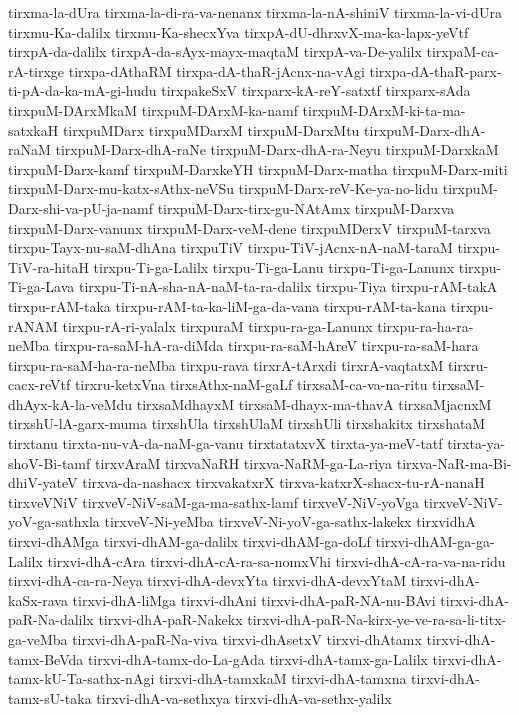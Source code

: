 {tirxma-la-dUra
tirxma-la-di-ra-va-nenanx
tirxma-la-nA-shiniV
tirxma-la-vi-dUra
tirxmu-Ka-dalilx
tirxmu-Ka-shecxYva
tirxpA-dU-dhrxvX-ma-ka-lapx-yeVtf
tirxpA-da-dalilx
tirxpA-da-sAyx-mayx-maqtaM
tirxpA-va-De-yalilx
tirxpaM-ca-rA-tirxge
tirxpa-dAthaRM
tirxpa-dA-thaR-jAcnx-na-vAgi
tirxpa-dA-thaR-parx-ti-pA-da-ka-mA-gi-hudu
tirxpakeSxV
tirxparx-kA-reY-satxtf
tirxparx-sAda
tirxpuM-DArxMkaM
tirxpuM-DArxM-ka-namf
tirxpuM-DArxM-ki-ta-ma-satxkaH
tirxpuMDarx
tirxpuMDarxM
tirxpuM-DarxMtu
tirxpuM-Darx-dhA-raNaM
tirxpuM-Darx-dhA-raNe
tirxpuM-Darx-dhA-ra-Neyu
tirxpuM-DarxkaM
tirxpuM-Darx-kamf
tirxpuM-DarxkeYH
tirxpuM-Darx-matha
tirxpuM-Darx-miti
tirxpuM-Darx-mu-katx-sAthx-neVSu
tirxpuM-Darx-reV-Ke-ya-no-lidu
tirxpuM-Darx-shi-va-pU-ja-namf
tirxpuM-Darx-tirx-gu-NAtAmx
tirxpuM-Darxva
tirxpuM-Darx-vanunx
tirxpuM-Darx-veM-dene
tirxpuMDerxV
tirxpuM-tarxva
tirxpu-Tayx-nu-saM-dhAna
tirxpuTiV
tirxpu-TiV-jAcnx-nA-naM-taraM
tirxpu-TiV-ra-hitaH
tirxpu-Ti-ga-Lalilx
tirxpu-Ti-ga-Lanu
tirxpu-Ti-ga-Lanunx
tirxpu-Ti-ga-Lava
tirxpu-Ti-nA-sha-nA-naM-ta-ra-dalilx
tirxpu-Tiya
tirxpu-rAM-takA
tirxpu-rAM-taka
tirxpu-rAM-ta-ka-liM-ga-da-vana
tirxpu-rAM-ta-kana
tirxpu-rANAM
tirxpu-rA-ri-yalalx
tirxpuraM
tirxpu-ra-ga-Lanunx
tirxpu-ra-ha-ra-neMba
tirxpu-ra-saM-hA-ra-diMda
tirxpu-ra-saM-hAreV
tirxpu-ra-saM-hara
tirxpu-ra-saM-ha-ra-neMba
tirxpu-rava
tirxrA-tArxdi
tirxrA-vaqtatxM
tirxru-cacx-reVtf
tirxru-ketxVna
tirxsAthx-naM-gaLf
tirxsaM-ca-va-na-ritu
tirxsaM-dhAyx-kA-la-veMdu
tirxsaMdhayxM
tirxsaM-dhayx-ma-thavA
tirxsaMjacnxM
tirxshU-lA-garx-muma
tirxshUla
tirxshUlaM
tirxshUli
tirxshakitx
tirxshataM
tirxtanu
tirxta-nu-vA-da-naM-ga-vanu
tirxtatatxvX
tirxta-ya-meV-tatf
tirxta-ya-shoV-Bi-tamf
tirxvAraM
tirxvaNaRH
tirxva-NaRM-ga-La-riya
tirxva-NaR-ma-Bi-dhiV-yateV
tirxva-da-nashacx
tirxvakatxrX
tirxva-katxrX-shacx-tu-rA-nanaH
tirxveVNiV
tirxveV-NiV-saM-ga-ma-sathx-lamf
tirxveV-NiV-yoVga
tirxveV-NiV-yoV-ga-sathxla
tirxveV-Ni-yeMba
tirxveV-Ni-yoV-ga-sathx-lakekx
tirxvidhA
tirxvi-dhAMga
tirxvi-dhAM-ga-dalilx
tirxvi-dhAM-ga-doLf
tirxvi-dhAM-ga-ga-Lalilx
tirxvi-dhA-cAra
tirxvi-dhA-cA-ra-sa-nomxVhi
tirxvi-dhA-cA-ra-va-na-ridu
tirxvi-dhA-ca-ra-Neya
tirxvi-dhA-devxYta
tirxvi-dhA-devxYtaM
tirxvi-dhA-kaSx-rava
tirxvi-dhA-liMga
tirxvi-dhAni
tirxvi-dhA-paR-NA-nu-BAvi
tirxvi-dhA-paR-Na-dalilx
tirxvi-dhA-paR-Nakekx
tirxvi-dhA-paR-Na-kirx-ye-ve-ra-sa-li-titx-ga-veMba
tirxvi-dhA-paR-Na-viva
tirxvi-dhAsetxV
tirxvi-dhAtamx
tirxvi-dhA-tamx-BeVda
tirxvi-dhA-tamx-do-La-gAda
tirxvi-dhA-tamx-ga-Lalilx
tirxvi-dhA-tamx-kU-Ta-sathx-nAgi
tirxvi-dhA-tamxkaM
tirxvi-dhA-tamxna
tirxvi-dhA-tamx-sU-taka
tirxvi-dhA-va-sethxya
tirxvi-dhA-va-sethx-yalilx
}
